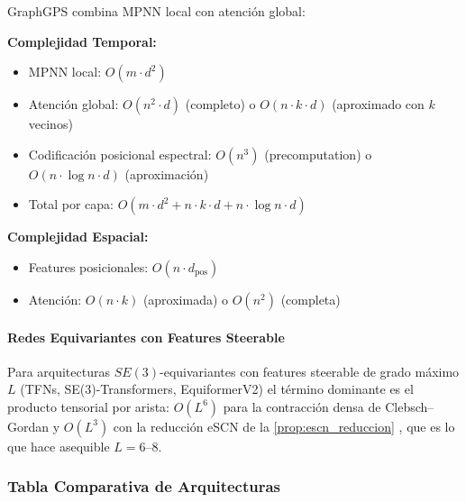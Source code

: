 GraphGPS combina \gls{MPNN} local con atención global:

\textbf{Complejidad Temporal:}
\begin{itemize}
\item \gls{MPNN} local: $O(m \cdot d^2)$
\item Atención global: $O(n^2 \cdot d)$ (completo) o $O(n \cdot k \cdot d)$ (aproximado con $k$ vecinos)
\item Codificación posicional espectral: $O(n^3)$ (precomputation) o $O(n \cdot \log n \cdot d)$ (aproximación)
\item Total por capa: $O(m \cdot d^2 + n \cdot k \cdot d + n \cdot \log n \cdot d)$
\end{itemize}

\textbf{Complejidad Espacial:}
\begin{itemize}
\item Features posicionales: $O(n \cdot d_{\text{pos}})$
\item Atención: $O(n \cdot k)$ (aproximada) o $O(n^2)$ (completa)
\end{itemize}

\paragraph{Redes Equivariantes con Features Steerable}

Para arquitecturas $SE(3)$-equivariantes con features steerable de grado máximo $L$ (TFNs, SE(3)-Transformers, EquiformerV2) el término dominante es el producto tensorial por arista: $O(L^6)$ para la contracción densa de Clebsch--Gordan y $O(L^3)$ con la reducción eSCN de la \autoref{prop:escn_reduccion} \citep{passaro2023escn}, que es lo que hace asequible $L = 6$--$8$.

\subsubsection{Tabla Comparativa de Arquitecturas}

